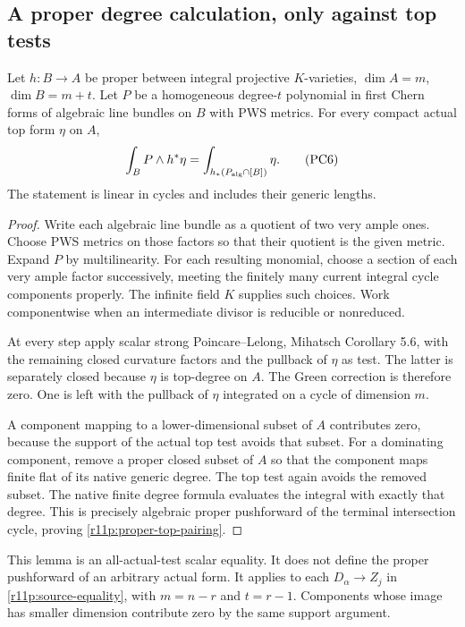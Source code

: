 \subsection{A proper degree calculation, only against top tests}

\begin{lemma}
\label{r11p:proper-chern-degree}
Let $h:B\to A$ be proper between integral projective $K$-varieties,
$\dim A=m$, $\dim B=m+t$.  Let $P$ be a homogeneous degree-$t$
polynomial in first Chern forms of algebraic line bundles on $B$
with PWS metrics.  For every compact actual top form $\eta$ on $A$,
\[
              \int_BP\wedge h^*\eta
                =\int_{h_*(P_{\rm alg}\cap[B])}\eta.
\tag{PC6}\label{r11p:proper-top-pairing}
\]
The statement is linear in cycles and includes their generic lengths.
\end{lemma}

\begin{proof}
Write each algebraic line bundle as a quotient of two very ample ones.
Choose PWS metrics on those factors so that their quotient is the
given metric.  Expand $P$ by multilinearity.  For each resulting
monomial, choose a section of each very ample factor successively,
meeting the finitely many current integral cycle components properly.
The infinite field $K$ supplies such choices.  Work componentwise
when an intermediate divisor is reducible or nonreduced.

At every step apply scalar strong Poincare--Lelong, Mihatsch
Corollary 5.6, with the remaining closed curvature factors and the
pullback of $\eta$ as test.  The latter is separately closed because
$\eta$ is top-degree on $A$.  The Green correction is therefore zero.
One is left with the pullback of $\eta$ integrated on a cycle of
dimension $m$.

A component mapping to a lower-dimensional subset of $A$ contributes
zero, because the support of the actual top test avoids that subset.
For a dominating component, remove a proper closed subset of $A$
so that the component maps finite flat of its native generic degree.
The top test again avoids the removed subset.  The native finite
degree formula evaluates the integral with exactly that degree.
This is precisely algebraic proper pushforward of the terminal
intersection cycle, proving \eqref{r11p:proper-top-pairing}.
\end{proof}

This lemma is an all-actual-test scalar equality.  It does not define
the proper pushforward of an arbitrary actual form.  It applies to
each $D_\alpha\to Z_j$ in \eqref{r11p:source-equality}, with
$m=n-r$ and $t=r-1$.  Components whose image has smaller dimension
contribute zero by the same support argument.

